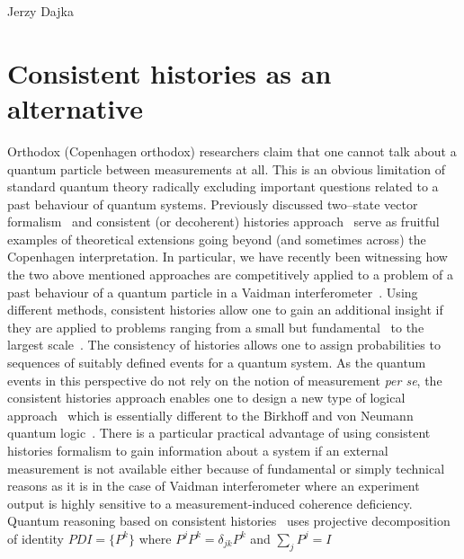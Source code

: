 \begin{artengenv}{Jerzy Dajka}

\section{Consistent histories as an alternative}  

Orthodox (Copenhagen orthodox) researchers claim that one 
cannot talk about a quantum particle between measurements at all. This is an obvious limitation of standard quantum theory radically excluding important questions related to a past behaviour of quantum systems.   
%
Previously discussed  two--state vector formalism~\parencite{Aharonov2008} and consistent (or decoherent) histories approach~\parencite{Griffiths,Griffiths1984,Omnes1988,Omnes1,gel1,gel} serve  as fruitful examples of theoretical extensions  going beyond (and sometimes across) the Copenhagen interpretation. In particular,  we have recently been  witnessing how  the two above mentioned approaches are competitively applied to a  problem  of a past behaviour of a quantum particle in a Vaidman interferometer~\parencite{PhysRevA.87.052104,PhysRevA.95.066101,scirep}. Using different methods, consistent histories allow one to gain an additional insight if they are applied to  problems  ranging from a small but fundamental~\parencite{GRIFFITHS_measur,GRIFFITHS_onto,Griffiths2014,mea1} to the largest scale~\parencite{zur1,q_cosm}. The consistency of  histories  allows one
to assign probabilities to sequences of suitably defined events for a quantum system. As the quantum events in this perspective  do  not rely on the notion of measurement {\it per se}, the consistent histories approach enables one to design a new type of logical approach~\parencite{Griffiths1984} which is essentially different to the Birkhoff and von Neumann quantum logic~\parencite{qlog}. There is a particular practical advantage of using consistent histories formalism to gain information about a system if
an external measurement is not available either because of fundamental or simply technical reasons as it is in the case of  Vaidman interferometer where an experiment output is highly sensitive to a measurement-induced coherence deficiency. 
%
Quantum reasoning based on consistent histories~\parencite{Griffiths_reason} uses projective decomposition of identity $PDI=\{P^k\}$ 
where $P^jP^k =\delta_{jk}P^k$ and $\sum_j P^j=I$

\end{artengenv}
